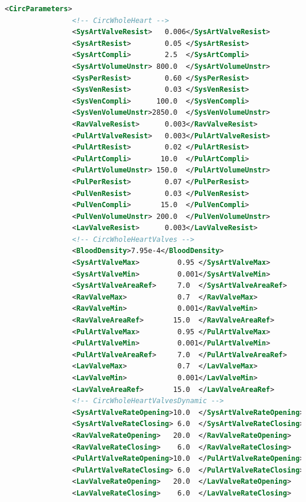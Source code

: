 \begin{lstlisting}[language=XML,caption=.xml settings for the 4-chamber circulation model]
            <CircParameters>
                <!-- CircWholeHeart -->
                <SysArtValveResist>   0.006</SysArtValveResist>
                <SysArtResist>        0.05 </SysArtResist>
                <SysArtCompli>        2.5  </SysArtCompli>
                <SysArtVolumeUnstr> 800.0  </SysArtVolumeUnstr>
                <SysPerResist>        0.60 </SysPerResist>
                <SysVenResist>        0.03 </SysVenResist>
                <SysVenCompli>      100.0  </SysVenCompli>
                <SysVenVolumeUnstr>2850.0  </SysVenVolumeUnstr>
                <RavValveResist>      0.003</RavValveResist>
                <PulArtValveResist>   0.003</PulArtValveResist>
                <PulArtResist>        0.02 </PulArtResist>
                <PulArtCompli>       10.0  </PulArtCompli>
                <PulArtVolumeUnstr> 150.0  </PulArtVolumeUnstr>
                <PulPerResist>        0.07 </PulPerResist>
                <PulVenResist>        0.03 </PulVenResist>
                <PulVenCompli>       15.0  </PulVenCompli>
                <PulVenVolumeUnstr> 200.0  </PulVenVolumeUnstr>
                <LavValveResist>      0.003</LavValveResist>
                <!-- CircWholeHeartValves -->
                <BloodDensity>7.95e-4</BloodDensity>
                <SysArtValveMax>         0.95 </SysArtValveMax>
                <SysArtValveMin>         0.001</SysArtValveMin>
                <SysArtValveAreaRef>     7.0  </SysArtValveAreaRef>
                <RavValveMax>            0.7  </RavValveMax>
                <RavValveMin>            0.001</RavValveMin>
                <RavValveAreaRef>       15.0  </RavValveAreaRef>
                <PulArtValveMax>         0.95 </PulArtValveMax>
                <PulArtValveMin>         0.001</PulArtValveMin>
                <PulArtValveAreaRef>     7.0  </PulArtValveAreaRef>
                <LavValveMax>            0.7  </LavValveMax>
                <LavValveMin>            0.001</LavValveMin>
                <LavValveAreaRef>       15.0  </LavValveAreaRef>
                <!-- CircWholeHeartValvesDynamic -->
                <SysArtValveRateOpening>10.0  </SysArtValveRateOpening>
                <SysArtValveRateClosing> 6.0  </SysArtValveRateClosing>
                <RavValveRateOpening>   20.0  </RavValveRateOpening>
                <RavValveRateClosing>    6.0  </RavValveRateClosing>
                <PulArtValveRateOpening>10.0  </PulArtValveRateOpening>
                <PulArtValveRateClosing> 6.0  </PulArtValveRateClosing>
                <LavValveRateOpening>   20.0  </LavValveRateOpening>
                <LavValveRateClosing>    6.0  </LavValveRateClosing>

\end{lstlisting}
